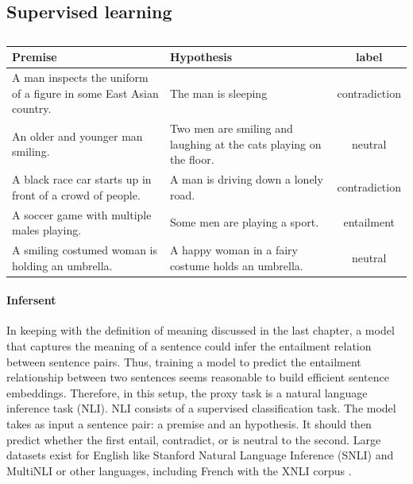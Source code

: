 
\subsection{Supervised learning}

\begin{table}[!htb]
\centering
\footnotesize
\begin{tabularx}{16cm}{@{}X X c@{} }
  \toprule
Premise & Hypothesis & label \\
\midrule
\midrule 
A man inspects the uniform of a figure in some East Asian country. & The man is sleeping & contradiction\\
\rule{0pt}{3ex}An older and younger man smiling. & Two men are smiling and laughing at the cats playing on the floor. & neutral\\
\rule{0pt}{3ex}A black race car starts up in front of a crowd of people. & A man is driving down a lonely road. & contradiction\\
\rule{0pt}{3ex}A soccer game with multiple males playing. & Some men are playing a sport. & entailment\\
\rule{0pt}{3ex}A smiling costumed woman is holding an umbrella. & A happy woman in a fairy costume holds an umbrella. & neutral\\
\bottomrule
\end{tabularx}
\caption{ }
\end{table}


\paragraph{Infersent} In keeping with the definition of meaning discussed in the last chapter, a model that captures the meaning of a sentence could infer the entailment relation between sentence pairs. Thus, training a model to predict the entailment relationship between two sentences seems reasonable to build efficient sentence embeddings. Therefore, in this setup, the proxy task is a natural language inference task (NLI). NLI consists of a supervised classification task. The model takes as input a sentence pair: a premise and an hypothesis. It should then predict whether the first entail, contradict, or is neutral to the second. Large datasets exist for English like Stanford Natural Language Inference (SNLI) \parencite{bowman_15} and MultiNLI \parencite{williams_18b} or other languages, including French with the XNLI corpus \parencite{conneau_18b}. 

